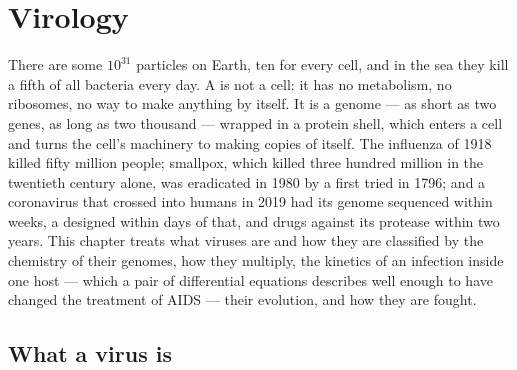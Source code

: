 \chapter{Virology}\label{ch:b3:virology}

There are some $10^{31}$  particles on Earth, ten for every cell,
and in the sea they kill a fifth of all bacteria every day. A  is
not a cell: it has no metabolism, no ribosomes, no way to make anything
by itself. It is a genome --- as short as two genes, as long as two
thousand --- wrapped in a protein shell, which enters a cell and turns
the cell's machinery to making copies of itself. The influenza of 1918
killed fifty million people; smallpox, which killed three hundred
million in the twentieth century alone, was eradicated in 1980 by a
 first tried in 1796; and a coronavirus that crossed into humans
in 2019 had its genome sequenced within weeks, a  designed within
days of that, and drugs against its protease within two years. This
chapter treats what viruses are and how they are classified by the
chemistry of their genomes, how they multiply, the kinetics of an
infection inside one host --- which a pair of differential equations
describes well enough to have changed the treatment of AIDS --- their
evolution, and how they are fought.

\section{What a virus is}

